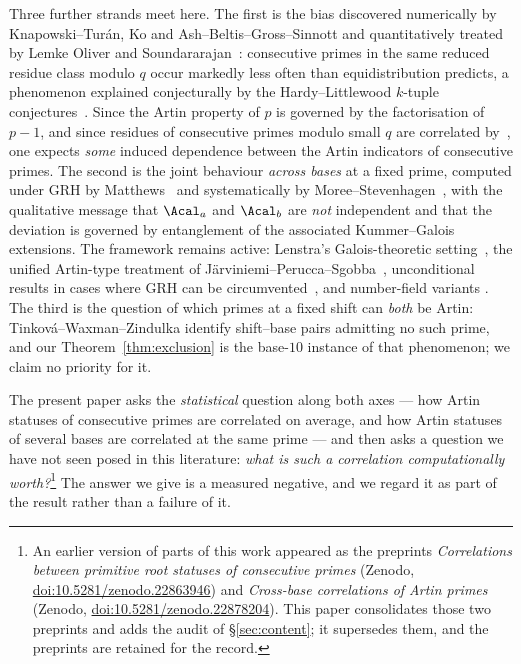 Three further strands meet here. The first is the bias discovered numerically by
Knapowski--Tur\'an, Ko and Ash--Beltis--Gross--Sinnott and quantitatively treated by
Lemke Oliver and Soundararajan~\cite{LOS2016}: consecutive primes in the same reduced
residue class modulo $q$ occur markedly less often than equidistribution predicts, a
phenomenon explained conjecturally by the Hardy--Littlewood $k$-tuple
conjectures~\cite{HardyLittlewood1923}. Since the Artin property of $p$ is governed by the
factorisation of $p-1$, and since residues of consecutive primes modulo small $q$ are
correlated by~\cite{LOS2016}, one expects \emph{some} induced dependence between the Artin
indicators of consecutive primes. The second is the joint behaviour \emph{across bases} at
a fixed prime, computed under GRH by Matthews~\cite{Matthews1976} and systematically by
Moree--Stevenhagen~\cite{MoreeStevenhagen2014}, with the qualitative message that
$\Acal_a$ and $\Acal_b$ are \emph{not} independent and that the deviation is governed by
entanglement of the associated Kummer--Galois extensions. The framework remains active:
Lenstra's Galois-theoretic setting~\cite{Lenstra1977}, the unified Artin-type treatment of
J\"arviniemi--Perucca--Sgobba~\cite{JarviniemiPeruccaSgobba2025}, unconditional results in
cases where GRH can be circumvented~\cite{Sgobba2025}, and number-field variants
\cite{Kimmel2024}. The third is the question of
which primes at a fixed shift can \emph{both} be Artin: Tinkov\'a--Waxman--Zindulka
\cite{TinkovaWaxmanZindulka2023} identify shift--base pairs admitting no such prime, and
our Theorem~\ref{thm:exclusion} is the base-$10$ instance of that phenomenon; we claim no
priority for it.

The present paper asks the \emph{statistical} question along both axes --- how Artin
statuses of consecutive primes are correlated on average, and how Artin statuses of several
bases are correlated at the same prime --- and then asks a question we have not seen posed
in this literature: \emph{what is such a correlation computationally worth?}\footnote{An
earlier version of parts of this work appeared as the preprints \emph{Correlations between
primitive root statuses of consecutive primes} (Zenodo,
\href{https://doi.org/10.5281/zenodo.22863946}{doi:10.5281/zenodo.22863946}) and
\emph{Cross-base correlations of Artin primes} (Zenodo,
\href{https://doi.org/10.5281/zenodo.22878204}{doi:10.5281/zenodo.22878204}). This paper
consolidates those two preprints and adds the audit of \S\ref{sec:content}; it supersedes
them, and the preprints are retained for the record.} The answer we give is a measured
negative, and we regard it as part of the result rather than a failure of it.

